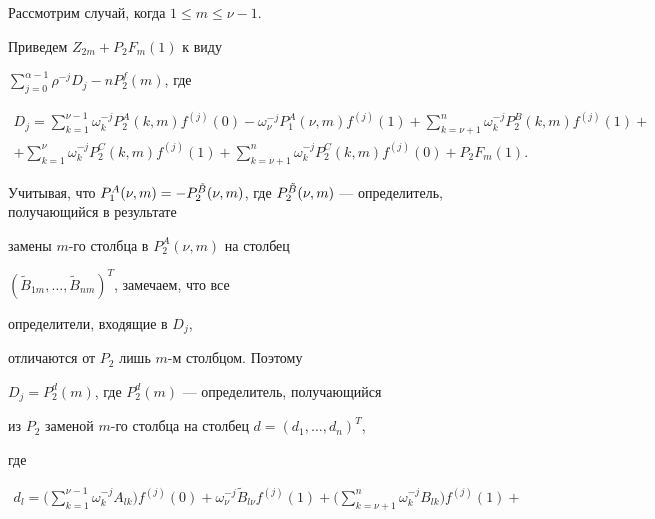 \begin{pf}


Рассмотрим случай, когда $1\le m\le\nu-1$.





Приведем $Z_{2m}+P_2F_m(1)$ к виду


$\sum\limits_{j=0}^{\alpha-1}\rho^{-j}D_j-nP_2^f(m)$, где


\begin{multline*}


D_j=\sum\limits_{k=1}^{\nu-1}\omega_k^{-j}P_2^A


(k,m)f^{(j)}(0)-\omega_\nu^{-j}P_1^A(\nu,m)f^{(j)}(1)+


\sum\limits_{k=\nu+1}^n\omega_k^{-j}P_2^B(k,m)f^{(j)}(1)+ \\


%


+\sum\limits_{k=1}^\nu\omega_k^{-j}P_2^C(k,m)f^{(j)}(1)+


\sum\limits_{k=\nu+1}^n\omega_k^{-j}P_2^C(k,m)f^{(j)}(0)+P_2F_m(1).


\end{multline*}





Учитывая, что $P_1^A(\nu,m)=-P_2^{\Tilde B}(\nu,m)$, где $P_2^


{\Tilde B}(\nu,m)$ --- определитель, получающийся в результате


замены $m$-го столбца в $P_2^A(\nu,m)$ на столбец


$(\widetilde B_{1m},\dotsc,\widetilde B_{nm})^T$, замечаем, что все


определители, входящие в $D_j$, 


отличаются от $P_2$ лишь $m$-м столбцом. Поэтому


$D_j=P_2^d(m)$, где $P_2^d(m)$ --- определитель, получающийся


из $P_2$ заменой $m$-го столбца на столбец $d=(d_1,\dotsc,d_n)^T$,


где


\begin{multline*}


d_l=\bigg(\sum\limits_{k=1}^{\nu-1}\omega_k^{-j}


A_{lk}\bigg)f^{(j)}(0)+\omega_\nu^{-j}\widetilde B_{l\nu}f^{(j)}(1)


+\bigg(\sum\limits_{k=\nu+1}^n\omega_k^{-j}B_{lk}\bigg)f^{(j)}(1)+ \\


%



\end{multline*}
\end{pf}
